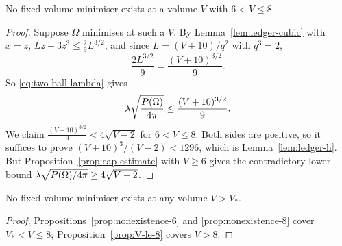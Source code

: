 \begin{proposition}\label{prop:nonexistence-8}
No fixed-volume minimiser exists at a volume $V$ with $6<V\le8$.
\end{proposition}

\begin{proof}
Suppose $\Omega$ minimises at such a $V$.  By
Lemma~\ref{lem:ledger-cubic} with $x=z$,
$Lz-3z^3\le\tfrac29L^{3/2}$, and since $L=(V+10)/q^2$ with $q^3=2$,
\begin{equation}\label{eq:cubic-value}
  \frac{2L^{3/2}}9=\frac{(V+10)^{3/2}}9 .
\end{equation}
So \eqref{eq:two-ball-lambda} gives
\begin{equation}\label{eq:cubic-upper}
  \lambda\sqrt{\frac{P(\Omega)}{4\pi}}\le\frac{(V+10)^{3/2}}9 .
\end{equation}
We claim $\tfrac{(V+10)^{3/2}}9<4\sqrt{V-2}$ for $6<V\le8$.  Both sides are
positive, so it suffices to prove $(V+10)^3/(V-2)<1296$, which is
Lemma~\ref{lem:ledger-h}.  But Proposition~\ref{prop:cap-estimate} with
$V\ge6$ gives the contradictory lower bound
$\lambda\sqrt{P(\Omega)/4\pi}\ge4\sqrt{V-2}$.
\end{proof}

\begin{corollary}\label{cor:nonexistence}
No fixed-volume minimiser exists at any volume $V>V_*$.
\end{corollary}

\begin{proof}
Propositions~\ref{prop:nonexistence-6} and \ref{prop:nonexistence-8} cover
$V_*<V\le8$; Proposition~\ref{prop:V-le-8} covers $V>8$.
\end{proof}

